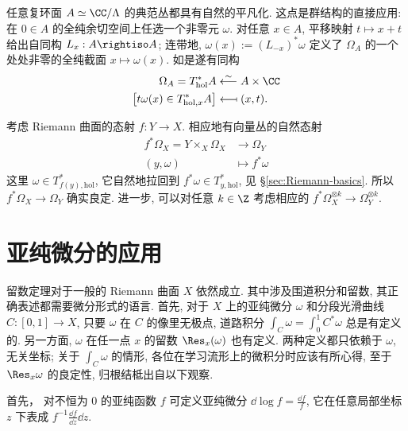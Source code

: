 \begin{example}\label{eg:canonical-bundle-tori}
	任意复环面 $A \simeq \CC/\Lambda$ 的典范丛都具有自然的平凡化. 这点是群结构的直接应用: 在 $0 \in A$ 的全纯余切空间上任选一个非零元 $\omega$. 对任意 $x \in A$, 平移映射 $t \mapsto x+t$ 给出自同构 $L_x: A \rightiso A$; 连带地, $\omega(x) := (L_{-x})^* \omega$ 定义了 $\Omega_A$ 的一个处处非零的全纯截面 $x \mapsto \omega(x)$. 如是遂有同构
	\begin{align*}
		\Omega_A = T^*_{\text{hol}} A & \stackrel{\sim}{\longleftarrow} A \times \CC \\
		\left[ t\omega(x) \in T^*_{\text{hol}, x} A \right] & \longmapsfrom (x, t).
	\end{align*}
\end{example}

考虑 Riemann 曲面的态射 $f: Y \to X$. 相应地有向量丛的自然态射
\begin{align*}
	f^* \Omega_X = Y \times_X \Omega_X & \longrightarrow \Omega_Y \\
	(y, \omega) & \longmapsto f^* \omega
\end{align*}
这里 $\omega \in T^*_{f(y), \text{hol}}$, 它自然地拉回到 $f^* \omega \in T^*_{y, \text{hol}}$, 见 \S\ref{sec:Riemann-basics}. 所以 $f^* \Omega_X \to \Omega_Y$ 确实良定. 进一步, 可以对任意 $k \in \Z$ 考虑相应的 $f^* \Omega_X^{\otimes k} \to \Omega_Y^{\otimes k}$.

\section{亚纯微分的应用}
留数定理对于一般的 Riemann 曲面 $X$ 依然成立. 其中涉及围道积分和留数, 其正确表述都需要微分形式的语言. 首先, 对于 $X$ 上的亚纯微分 $\omega$ 和分段光滑曲线 $C: [0,1] \to X$, 只要 $\omega$ 在 $C$ 的像里无极点, 道路积分 $\int_C \omega = \int_0^1 C^* \omega$ 总是有定义的. 另一方面, $\omega$ 在任一点 $x$ 的留数 $\Res_x(\omega)$ 也有定义. 两种定义都只依赖于 $\omega$, 无关坐标; 关于 $\int_C \omega$ 的情形, 各位在学习流形上的微积分时应该有所心得, 至于 $\Res_x \omega$ 的良定性, 归根结柢出自以下观察.

首先， 对不恒为 $0$ 的亚纯函数 $f$ 可定义亚纯微分 $\dd\log f = \frac{\dd f}{f}$, 它在任意局部坐标 $z$ 下表成 $f^{-1} \frac{\dd f}{\dd z} \dd z$.

